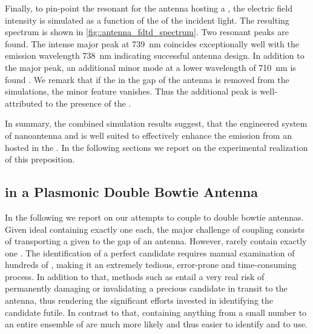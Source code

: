 		Finally, to pin-point the resonant \wl for the antenna hosting a \nd, the electric field intensity is simulated as a function of the \wl of the incident light. The resulting spectrum is shown in \autoref{fig::antenna_fdtd_spectrum}. Two resonant peaks are found. The intense major peak at \SI{739}{nm} coincides exceptionally well with the \siv emission wavelength \SI{738}{nm} indicating successful antenna design. In addition to the major peak, an additional minor mode at a lower wavelength of \SI{710}{nm} is found \cite{Rahbany2016}. We remark that if the \nd in the gap of the antenna is removed from the simulations, the minor feature vanishes. Thus the additional peak is well-attributed to the presence of the \nd.

		In summary, the combined simulation results suggest, that the engineered system of nanoantenna and \nd is well suited to effectively enhance the emission from an \siv hosted in the \nd. In the following sections we report on the experimental realization of this preposition.

	\subsection{\siv in a Plasmonic Double Bowtie Antenna}

		In the following we report on our attempts to couple \sivs to double bowtie antennas. Given ideal \nds containing exactly one \siv each, the major challenge of coupling consists of transporting a given \nd to the gap of an antenna. However, \nds rarely contain exactly one \siv. The identification of a perfect candidate requires manual examination of hundreds of \nds, making it an extremely tedious, error-prone and time-consuming process. In addition to that, methods such as \pp entail a very real risk of permanently damaging or invalidating a precious candidate in transit to the antenna, thus rendering the significant efforts invested in identifying the candidate futile. In contrast to that, \nds containing anything from a small number to an entire ensemble of \sivs are much more likely and thus easier to identify and to use.

